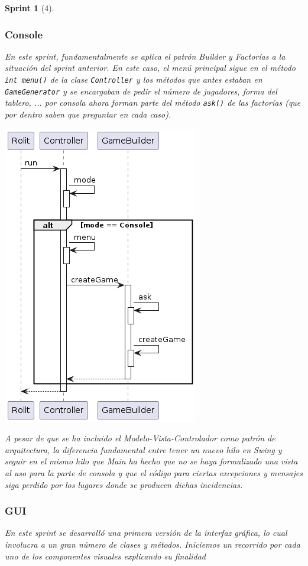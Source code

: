 \documentclass{article}
\theoremstyle{break}
\newtheorem*{sprint}{Sprint}
\begin{document}
\begin{sprint}[4]
\subsubsection{Console}
En este sprint, fundamentalmente se aplica el patrón Builder y Factorías a la situación del sprint anterior. En este caso, el menú principal sigue en el método \texttt{int menu()} de la clase \texttt{Controller} y los métodos que antes estaban en \texttt{GameGenerator} y se encargaban de pedir el número de jugadores, forma del tablero, ... por consola ahora forman parte del método \texttt{ask()} de las factorías (que por dentro saben que preguntar en cada caso).
\begin{center}
\includegraphics[scale=0.55]{MenuPpal_sprint4_seq}
\end{center}
A pesar de que se ha incluido el \textit{Modelo-Vista-Controlador} como patrón de arquitectura, la diferencia fundamental entre tener un nuevo hilo en \textit{Swing} y seguir en el mismo hilo que \textit{Main} ha hecho que no se haya formalizado una vista al uso para la parte de consola y que el código para ciertas excepciones y mensajes siga perdido por los lugares donde se producen dichas incidencias.

\subsubsection{GUI}
En este sprint se desarrolló una primera versión de la interfaz gráfica, lo cual involucra a un gran número de clases y métodos. Iniciemos un recorrido por cada uno de los componentes visuales explicando su finalidad


\end{sprint}
\end{document}
